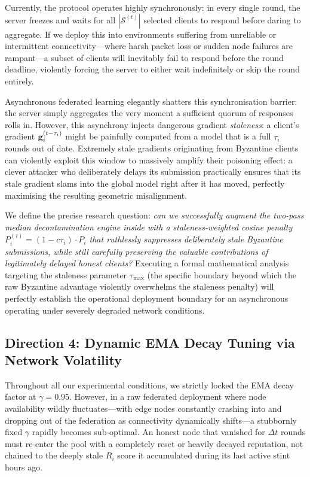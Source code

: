 \documentclass[../main.tex]{subfiles}
\begin{document}
Currently, the \aegis{} protocol operates highly synchronously: in every single round, the server freezes and waits for all $|\mathcal{S}^{(t)}|$ selected clients to respond before daring to aggregate. If we deploy this into environments suffering from unreliable or intermittent connectivity---where harsh packet loss or sudden node failures are rampant---a subset of clients will inevitably fail to respond before the round deadline, violently forcing the server to either wait indefinitely or skip the round entirely.

Asynchronous federated learning \citep{xie2019asynchronous} elegantly shatters this synchronisation barrier: the server simply aggregates the very moment a sufficient quorum of responses rolls in. However, this asynchrony injects dangerous gradient \emph{staleness}: a client's gradient $\mathbf{g}_{i}^{(t-\tau_i)}$ might be painfully computed from a model that is a full $\tau_i$ rounds out of date. Extremely stale gradients originating from Byzantine clients can violently exploit this window to massively amplify their poisoning effect: a clever attacker who deliberately delays its submission practically ensures that its stale gradient slams into the global model right after it has moved, perfectly maximising the resulting geometric misalignment.

We define the precise research question: \emph{can we successfully augment the two-pass median decontamination engine inside \aegis{} with a staleness-weighted cosine penalty $P_i^{(\tau)} = (1 - c\tau_i) \cdot P_i$ that ruthlessly suppresses deliberately stale Byzantine submissions, while still carefully preserving the valuable contributions of legitimately delayed honest clients?} Executing a formal mathematical analysis targeting the staleness parameter $\tau_{\max}$ (the specific boundary beyond which the raw Byzantine advantage violently overwhelms the staleness penalty) will perfectly establish the operational deployment boundary for an asynchronous \aegis{} operating under severely degraded network conditions.

\subsection{Direction 4: Dynamic EMA Decay Tuning via Network Volatility}
\label{sec:future_dynamic_gamma}

Throughout all our experimental conditions, we strictly locked the EMA decay factor at $\gamma = 0.95$. However, in a raw federated deployment where node availability wildly fluctuates---with edge nodes constantly crashing into and dropping out of the federation as connectivity dynamically shifts---a stubbornly fixed $\gamma$ rapidly becomes sub-optimal. An honest node that vanished for $\Delta t$ rounds must re-enter the pool with a completely reset or heavily decayed reputation, not chained to the deeply stale $R_i$ score it accumulated during its last active stint hours ago.
\end{document}
